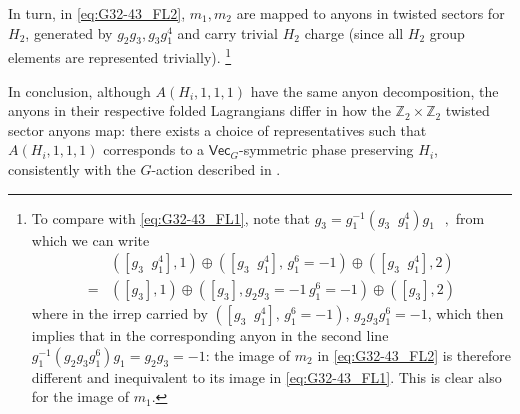 \documentclass[aps,twocolumn,prx,floatfix,preprintnumbers, nofootinbib,10pt]{revtex4-2}
\numberwithin{equation}{section}
\theoremstyle{definition}
\newcommand{\Z}{{\mathbb Z}}
\renewcommand{\Vec}{\mathsf{Vec}}
\begin{document}
In turn, in \eqref{eq:G32-43_FL2}, $m_1,m_2$ are mapped to anyons in twisted sectors for $H_2$, generated by $g_2g_3,g_3g_1^4$ and carry trivial $H_2$ charge (since all $H_2$ group elements are represented trivially). \footnote{To compare with \eqref{eq:G32-43_FL1}, note that $g_3= g_1^{-1}(g_3^{\phantom{-1}}\!\!\!\! g_1^4) g_1^{\phantom{-1}}\!\!\!\! \,,$
from which we can write
\begin{align}
&([g_3^{\phantom{-1}}\!\!\!\! g_1^4],1) \oplus ([g_3^{\phantom{-1}}\!\!\!\! g_1^4],\,g_1^6=-1) \oplus ([g_3^{\phantom{-1}}\!\!\!\! g_1^4],2)\\
=&([g_3],1) \oplus ([g_3], g_2 g_3=-1 \,g_1^6=-1) \oplus ([g_3],2)
\end{align}
where in the irrep carried by $([g_3^{\phantom{-1}}\!\!\!\! g_1^4],\,g_1^6=-1)$, $g_2g_3g_1^6=-1$, which then implies that in the corresponding anyon in the second line $g_1^{-1}(g_2g_3g_1^6)g_1=g_2g_3=-1$: the image of $m_2$ in \eqref{eq:G32-43_FL2} is therefore different and inequivalent to its image in \eqref{eq:G32-43_FL1}. This is clear also for the image of $m_1$.}


In conclusion, although $A(H_i,1,1,1)$ have the same anyon decomposition, the anyons in their respective folded Lagrangians differ in how the $\Z_2\times\Z_2$ twisted sector anyons map: there exists a choice of representatives such that $A(H_i,1,1,1)$ corresponds to a $\Vec_G$-symmetric phase preserving $H_i$, consistently with the $G$-action described in .
\end{document}
